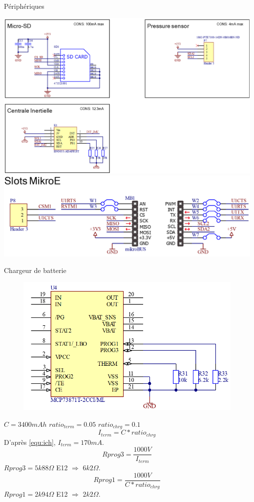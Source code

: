 \documentclass[compress,aspectratio=169]{beamer}
\begin{document}
\begin{frame}[containsverbatim]{Périphériques}
	 \par
	\noindent
	\includegraphics[width=0.49\linewidth]{Images/Dev-SCH/Periph1}
	\hfill
	\includegraphics[width=0.49\linewidth]{Images/Dev-SCH/Mikroe}
	\par	 
\end{frame}

\begin{frame}[containsverbatim]{Chargeur de batterie}
	\begin{figure}[h]
		\centering
		\includegraphics[width=0.3\linewidth]{Images/Dev-SCH/ChargeBat}
	\end{figure}
	$C = 3400mAh$ \quad $ratio_{term} = 0.05$ \quad $ratio_{chrg} = 0.1$\vspace{-2mm}
	\begin{equation} \label{equ:ich}
		I_{term} = C * ratio_{chrg} 
	\end{equation}
	D'après \ref{equ:ich}, $I_{term} = 170mA$.\vspace{-3mm}
	\begin{equation} \label{equ:Rprog3}
		Rprog3 = \frac{1000V}{I_{term}}
	\end{equation}
	$Rprog3 = 5k88 \Omega$ E12 $\Longrightarrow$ $6k2\Omega$.\vspace{-3mm}
	\begin{equation} \label{equ:Rprog1}
		Rprog1 = \frac{1000V}{C * ratio_{chrg}} 
	\end{equation} \vspace{-3mm}
	$Rprog1 = 2k94 \Omega$ E12 $\Longrightarrow$ $2k2\Omega$.
	
\end{frame}
\end{document}
